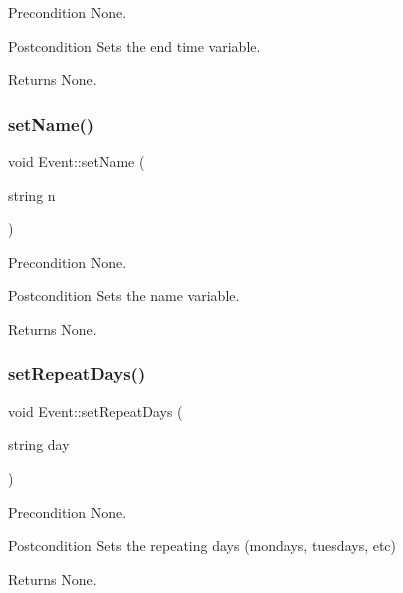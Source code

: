 \begin{DoxyPrecond}{Precondition}
None. 
\end{DoxyPrecond}
\begin{DoxyPostcond}{Postcondition}
Sets the end time variable. 
\end{DoxyPostcond}
\begin{DoxyReturn}{Returns}
None. 
\end{DoxyReturn}
\hypertarget{class_event_a613156e63ec4251293134fcec6a93454}{}\label{class_event_a613156e63ec4251293134fcec6a93454} 
\subsubsection{\texorpdfstring{set\+Name()}{setName()}}
{\footnotesize\ttfamily void Event\+::set\+Name (\begin{DoxyParamCaption}\item[{string}]{n }\end{DoxyParamCaption})}

\begin{DoxyPrecond}{Precondition}
None. 
\end{DoxyPrecond}
\begin{DoxyPostcond}{Postcondition}
Sets the name variable. 
\end{DoxyPostcond}
\begin{DoxyReturn}{Returns}
None. 
\end{DoxyReturn}
\hypertarget{class_event_ae8acd6e1fc6c6e7e32b55e8345d4eb5e}{}\label{class_event_ae8acd6e1fc6c6e7e32b55e8345d4eb5e} 
\subsubsection{\texorpdfstring{set\+Repeat\+Days()}{setRepeatDays()}}
{\footnotesize\ttfamily void Event\+::set\+Repeat\+Days (\begin{DoxyParamCaption}\item[{string}]{day }\end{DoxyParamCaption})}

\begin{DoxyPrecond}{Precondition}
None. 
\end{DoxyPrecond}
\begin{DoxyPostcond}{Postcondition}
Sets the repeating days (mondays, tuesdays, etc) 
\end{DoxyPostcond}
\begin{DoxyReturn}{Returns}
None. 
\end{DoxyReturn}
\hypertarget{class_event_a453dbe18702a45d928cc8947023a9007}{}\label{class_event_a453dbe18702a45d928cc8947023a9007} 
